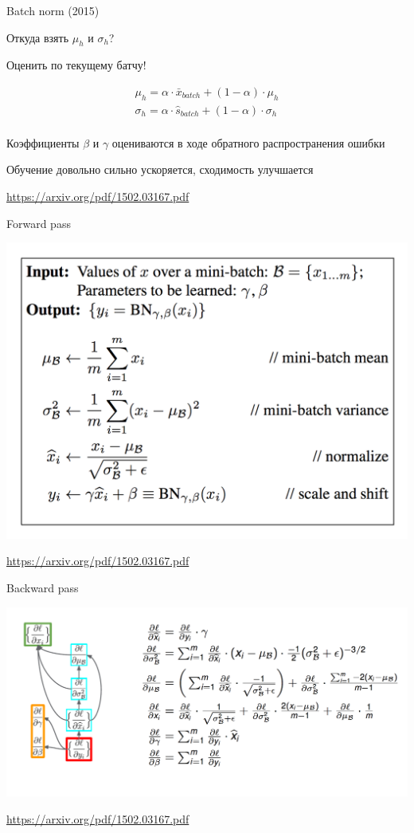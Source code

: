 \documentclass[notes,12pt, aspectratio=169]{beamer}
\newenvironment{wideitemize}{\itemize\addtolength{\itemsep}{10pt}}{\enditemize}
\begin{document}
\begin{frame}{Batch norm (2015)}
\begin{wideitemize}
\item  Откуда взять $\mu_h$ и $\sigma_h$? 

\item Оценить по текущему батчу! 

\begin{align*} 
\mu_h =  \alpha \cdot \bar x_{batch}  + (1 - \alpha) \cdot \mu_h \\ 
\sigma_h =  \alpha \cdot \hat s_{batch}  + (1 - \alpha) \cdot \sigma_h \\ 
\end{align*}

\item Коэффициенты $\beta$ и $\gamma$ оцениваются в ходе обратного распространения ошибки

\item Обучение довольно сильно ускоряется, сходимость улучшается 
\end{wideitemize}

\vfill %
\footnotesize
{\color{blue} \url{https://arxiv.org/pdf/1502.03167.pdf}}
\end{frame}


\begin{frame}{Forward pass}
\begin{center}
	\includegraphics[width=.6\linewidth]{batch_formulas.png}
\end{center}
\vfill %
\footnotesize
{\color{blue} \url{https://arxiv.org/pdf/1502.03167.pdf}}
\end{frame}


\begin{frame}{Backward pass}
\begin{center}
	\includegraphics[width=.9\linewidth]{batch_grad.png}
\end{center}
\vfill %
\footnotesize
{\color{blue} \url{https://arxiv.org/pdf/1502.03167.pdf}}
\end{frame}
\end{document}
